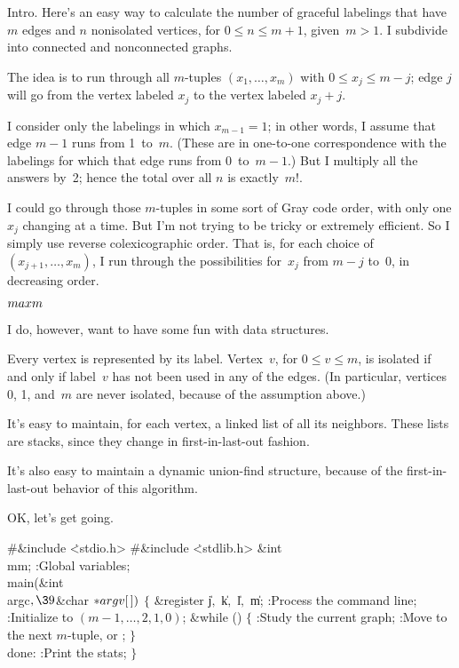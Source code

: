 

Intro. Here's an easy way to calculate the number of graceful labelings
that
have $m$ edges and $n$ nonisolated vertices, for $0\le n\le m+1$,
given~$m>1$. I subdivide into connected and nonconnected graphs.

The idea is to run through all $m$-tuples $(x_1,\ldots,x_m)$ with
$0\le x_j\le m-j$; edge $j$ will go from the vertex labeled $x_j$
to the vertex labeled $x_j+j$.

I consider only the labelings in which $x_{m-1}=1$; in other words,
I assume that edge $m-1$ runs from 1~to~$m$.
(These are in one-to-one correspondence with the labelings for which that
edge runs from 0~to~$m{-}1$.) But I multiply all the answers by~2;
hence the total over all $n$ is exactly~$m!$.

I could go through those $m$-tuples in some sort of Gray code order,
with only one $x_j$ changing at a time. But I'm not trying to
be tricky or extremely efficient. So I simply use reverse colexicographic
order.
That is, for each choice of $(x_{j+1},\ldots,x_m)$, I run through the
possibilities for~$x_j$ from $m-j$ to~0, in decreasing order.

\Y\B\4\D$\\{maxm}$ \5
\par
\fi

I do, however, want to have some fun with data structures.

Every vertex is represented by its label. Vertex~$v$, for $0\le v\le m$,
is isolated if and only if label~$v$ has not been used in any of
the edges. (In particular, vertices 0, 1, and~$m$ are never isolated,
because of the assumption above.)

It's easy to maintain, for each vertex, a linked list of all
its neighbors.
These lists are stacks, since they change in first-in-last-out fashion.

It's also easy to maintain a dynamic union-find structure, because
of the first-in-last-out behavior of this algorithm.

\fi

OK, let's get going.

\Y\B\8\#\&{include} \.{<stdio.h>}\6
\8\#\&{include} \.{<stdlib.h>}\6
\&{int} \\{mm};\7
:Global variables\X;\7
\\{main}(\&{int} \\{argc}${},\39{}$\&{char} ${}{*}\\{argv}[\,]){}$\1\1\2\2\6
${}\{{}$\1\6
\&{register} \|j${},{}$ \|k${},{}$ \|l${},{}$ \|m;\7
:Process the command line\X;\6
:Initialize to $(m-1,\ldots,2,1,0)$\X;\6
\&{while} ()\5
${}\{{}$\1\6
:Study the current graph\X;\6
:Move to the next $m$-tuple, or \X;\6
\4${}\}{}$\2\6
\4\\{done}:\5
:Print the stats\X;\6
\4${}\}{}$\2\par
\fi

